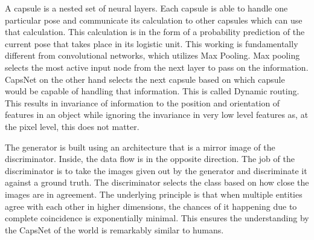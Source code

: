 A capsule is a nested set of neural layers. Each capsule is able to handle one particular pose and communicate its calculation to other capsules which can use that calculation. This calculation is in the form of a probability prediction of the current pose that takes place in its logistic unit. This working is fundamentally different from convolutional networks, which utilizes Max Pooling. Max pooling selects the most active input node from the next layer to pass on the information. CapsNet on the other hand selects the next capsule based on which capsule would be capable of handling that information. This is called Dynamic routing. This results in invariance of information to the position and orientation of features in an object while ignoring the invariance in very low level features as, at the pixel level, this does not matter.
\par\bigskip

The generator is built using an architecture that is a mirror image of the discriminator. Inside, the data flow is in the opposite direction. The job of the discriminator is to take the images given out by the generator and discriminate it against a ground truth. The discriminator selects the class based on how close the images are in agreement. The underlying principle is that when multiple entities agree with each other in higher dimensions, the chances of it happening due to complete coincidence is exponentially minimal. This ensures the understanding by the CapsNet of the world is remarkably similar to humans.